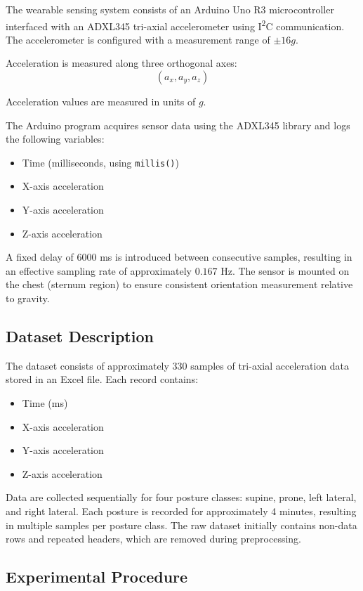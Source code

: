 \documentclass[conference]{IEEEtran}
\begin{document}
The wearable sensing system consists of an Arduino Uno R3 microcontroller interfaced with an ADXL345 tri-axial accelerometer using I\textsuperscript{2}C communication. The accelerometer is configured with a measurement range of $\pm 16g$.

Acceleration is measured along three orthogonal axes:
\begin{equation}
(a_x, a_y, a_z)
\end{equation}

Acceleration values are measured in units of $g$.

The Arduino program acquires sensor data using the ADXL345 library and logs the following variables:
\begin{itemize}
    \item Time (milliseconds, using \texttt{millis()})
    \item X-axis acceleration
    \item Y-axis acceleration
    \item Z-axis acceleration
\end{itemize}

A fixed delay of 6000 ms is introduced between consecutive samples, resulting in an effective sampling rate of approximately $0.167$ Hz. The sensor is mounted on the chest (sternum region) to ensure consistent orientation measurement relative to gravity.

\subsection{Dataset Description}

The dataset consists of approximately 330 samples of tri-axial acceleration data stored in an Excel file. Each record contains:
\begin{itemize}
    \item Time (ms)
    \item X-axis acceleration
    \item Y-axis acceleration
    \item Z-axis acceleration
\end{itemize}

Data are collected sequentially for four posture classes: supine, prone, left lateral, and right lateral. Each posture is recorded for approximately 4 minutes, resulting in multiple samples per posture class. The raw dataset initially contains non-data rows and repeated headers, which are removed during preprocessing.

\subsection{Experimental Procedure}
\end{document}
